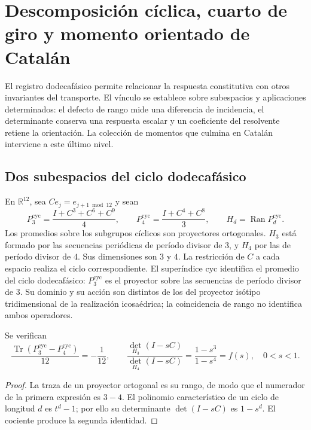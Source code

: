 \section{Descomposición cíclica, cuarto de giro y momento orientado de Catalán}
\label{iii:sec:catalan}

El registro dodecafásico permite relacionar la respuesta constitutiva con
otros invariantes del transporte. El vínculo se establece sobre subespacios
y aplicaciones determinados: el defecto de rango mide una diferencia de
incidencia, el determinante conserva una respuesta escalar y un coeficiente
del resolvente retiene la orientación. La colección de momentos que culmina
en Catalán interviene a este último nivel.

\subsection{Dos subespacios del ciclo dodecafásico}

En $\mathbb R^{12}$, sea $C e_j=e_{j+1\bmod12}$ y sean
\begin{equation}
 P_3^{\mathrm{cyc}}=\frac{I+C^3+C^6+C^9}{4},\qquad
 P_4^{\mathrm{cyc}}=\frac{I+C^4+C^8}{3},\qquad
 H_d=\operatorname{Ran}P_d^{\mathrm{cyc}}.
 \label{iii:eq:projectors34}
\end{equation}
Los promedios sobre los subgrupos cíclicos son proyectores ortogonales.
$H_3$ está formado por las secuencias periódicas de período divisor de $3$,
y $H_4$ por las de período divisor de $4$. Sus dimensiones son $3$ y $4$.
La restricción de $C$ a cada espacio realiza el ciclo correspondiente.
El superíndice $\mathrm{cyc}$ identifica el promedio del ciclo dodecafásico:
$P_3^{\mathrm{cyc}}$ es el proyector sobre las secuencias de período divisor
de $3$. Su dominio y su acción son distintos de los del proyector isótipo
tridimensional de la realización icosaédrica; la coincidencia de rango
no identifica ambos operadores.

\begin{proposition}
Se verifican
\begin{equation}
 \frac{\operatorname{Tr}(P_3^{\mathrm{cyc}}-P_4^{\mathrm{cyc}})}{12}=-\frac1{12},\qquad
 \frac{\det_{H_3}(I-sC)}{\det_{H_4}(I-sC)}
 =\frac{1-s^3}{1-s^4}=f(s),\quad 0<s<1.
 \label{iii:eq:trace-det}
\end{equation}
\end{proposition}
\begin{proof}
La traza de un proyector ortogonal es su rango, de modo que el numerador
de la primera expresión es $3-4$. El polinomio característico de un ciclo
de longitud $d$ es $t^d-1$; por ello su determinante $\det(I-sC)$ es
$1-s^d$. El cociente produce la segunda identidad.
\end{proof}

